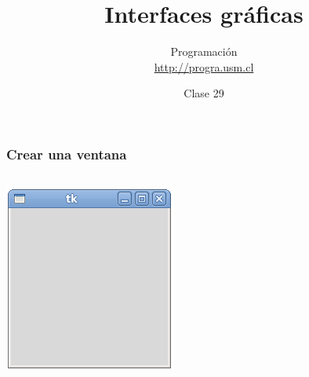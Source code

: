 \documentclass[12pt]{beamer}
\title{Interfaces gráficas}
\author{Programación \\ \url{http://progra.usm.cl}}
\date{Clase 29}
\begin{document}
  \begin{frame}
    \maketitle
  \end{frame}

  \begin{frame}
    \label{crear-ventana}
    \frametitle{Crear una ventana}
    \begin{columns}[B]
        \LARGE
        
        \vspace{10ex}
        \vspace{10ex}
        \includegraphics[width=\textwidth]{programas/tkinter/capturas/01.png}
    \end{columns}
  \end{frame}
\end{document}
